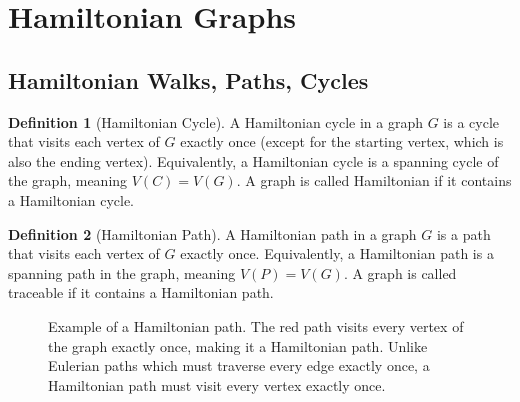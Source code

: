 \documentclass{article}
\theoremstyle{definition}
\newtheorem{definition}{Definition}
\begin{document}
\clearpage

\section{Hamiltonian Graphs}
\subsection{Hamiltonian Walks, Paths, Cycles}

\begin{definition}[Hamiltonian Cycle]
A Hamiltonian cycle in a graph $G$ is a cycle that visits each vertex of $G$ exactly once (except for the starting vertex, which is also the ending vertex). Equivalently, a Hamiltonian cycle is a spanning cycle of the graph, meaning $V(C) = V(G)$. A graph is called Hamiltonian if it contains a Hamiltonian cycle.
\end{definition}

\begin{definition}[Hamiltonian Path]
A Hamiltonian path in a graph $G$ is a path that visits each vertex of $G$ exactly once. Equivalently, a Hamiltonian path is a spanning path in the graph, meaning $V(P) = V(G)$. A graph is called traceable if it contains a Hamiltonian path.
\end{definition}

\begin{figure}[H]
    \centering
\caption{Example of a Hamiltonian path. The red path visits every vertex of the graph exactly once, making it a Hamiltonian path. Unlike Eulerian paths which must traverse every edge exactly once, a Hamiltonian path must visit every vertex exactly once.}
\label{fig:hamiltonian-path}
\end{figure}
\end{document}

